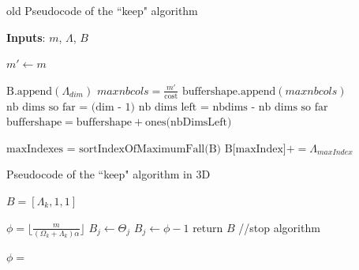 \documentclass[conference]{IEEEtran}
\begin{document}
\begin{algorithm}[h]
  \caption{old Pseudocode of the ``keep" algorithm}

  \begin{algorithmic}[1]

    \STATE \textbf{Inputs}: $m$, $\Lambda$, $B$

    \STATE $m' \gets m$

        \STATE $\textrm{B.append}(\Lambda_{dim})$
      \ENDIF
        \STATE $maxnbcols = \frac{m'}{\textrm{cost}}$
	      \STATE $\textrm{buffershape.append}(maxnbcols)$
      \ENDIF
        \STATE $\textrm{nb dims so far = (dim - 1)}$
        \STATE $\textrm{nb dims left = nbdims - nb dims so far}$
        \STATE $\textrm{buffershape} = \textrm{buffershape} + \textrm{ones(nbDimsLeft)}$
      \ENDIF
    \ENDFOR

    \STATE $\textrm{maxIndexes = sortIndexOfMaximumFall(B)}$ %
        \STATE $\textrm{B[maxIndex]} += \Lambda_{maxIndex}$
      \ENDWHILE
    \ENDFOR

  \end{algorithmic}
  \label{algo:getbuffershape}

\end{algorithm}

\begin{algorithm}[h]
  \caption{Pseudocode of the ``keep" algorithm in 3D}

  \begin{algorithmic}[1]
    \STATE $B = [\Lambda_k, 1, 1]$

    \STATE $ \phi = \lfloor \frac{m}{(\Omega_k + \Lambda_k)\alpha} \rfloor $
      \STATE $B_j \leftarrow \Theta_j$
    \ELSE
      \STATE $B_j \leftarrow \phi - 1$
      \STATE return $B$ //stop algorithm
    \ENDIF

    \STATE $\phi = $

  \end{algorithmic}
  \label{algo:keep_algorithm}
\end{algorithm}
\end{document}
